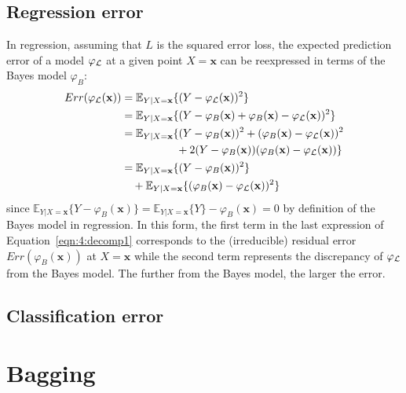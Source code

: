 \subsection{Regression error}

In regression, assuming that $L$ is the squared error loss, the expected
prediction error of a model $\varphi_{\cal L}$ at a given point $X=\mathbf{x}$
can be reexpressed in terms of the Bayes model $\varphi_B$:
\begin{align}
Err(\varphi_{\cal L}(\mathbf{x})) &= \mathbb{E}_{Y|X=\mathbf{x}} \{ (Y - \varphi_{\cal L}(\mathbf{x}))^2 \} \nonumber \\
                                  &= \mathbb{E}_{Y|X=\mathbf{x}} \{ (Y -\varphi_B(\mathbf{x}) + \varphi_B(\mathbf{x}) - \varphi_{\cal L}(\mathbf{x}))^2 \} \nonumber \\
                                  &= \mathbb{E}_{Y|X=\mathbf{x}} \{ (Y -\varphi_B(\mathbf{x}))^2 + (\varphi_B(\mathbf{x}) - \varphi_{\cal L}(\mathbf{x}))^2 \nonumber \\
                                  & \quad\quad\quad\quad\quad+ 2 (Y - \varphi_B(\mathbf{x}))(\varphi_B(\mathbf{x}) - \varphi_{\cal L}(\mathbf{x})) \} \nonumber \\
                                  &= \mathbb{E}_{Y|X=\mathbf{x}} \{ (Y -\varphi_B(\mathbf{x}))^2 \} \nonumber \\
                                  & \quad+ \mathbb{E}_{Y|X=\mathbf{x}} \{ (\varphi_B(\mathbf{x}) - \varphi_{\cal L}(\mathbf{x}))^2 \} \label{eqn:4:decomp1}
\end{align}
since $\mathbb{E}_{Y|X=\mathbf{x}} \{ Y - \varphi_B(\mathbf{x}) \} =
\mathbb{E}_{Y|X=\mathbf{x}} \{ Y \} - \varphi_B(\mathbf{x}) = 0$ by definition
of the Bayes model in regression. In this form, the first term in
the last expression of Equation~\ref{eqn:4:decomp1} corresponds to the (irreducible) residual error
$Err(\varphi_B(\mathbf{x}))$ at  $X=\mathbf{x}$ while the
second term represents the discrepancy of $\varphi_{\cal L}$ from the
Bayes model. The further from the Bayes model, the larger the error.

\subsection{Classification error}

\section{Bagging}
\label{sec:4:bagging}

